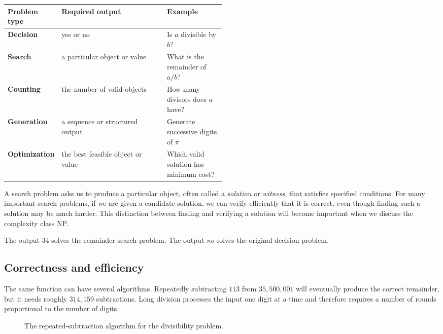 \documentclass[11pt]{article}
\begin{document}
\begin{center}
\begin{tabularx}{0.92\linewidth}{>{\bfseries}p{0.23\linewidth}X p{0.27\linewidth}}
\toprule
Problem type & Required output & Example \\
\midrule
Decision & yes or no & Is $a$ divisible by $b$? \\
Search & a particular object or value & What is the remainder of $a/b$? \\
Counting & the number of valid objects & How many divisors does $a$ have? \\
Generation & a sequence or structured output & Generate successive digits of $\pi$ \\
Optimization & the best feasible object or value & Which valid solution has minimum cost? \\
\bottomrule
\end{tabularx}
\end{center}

A search problem asks us to produce a particular object, often called a
\emph{solution} or \emph{witness}, that satisfies specified conditions. For many
important search problems, if we are given a candidate solution, we can verify
efficiently that it is correct, even though finding such a solution may be much
harder. This distinction between finding and verifying a solution will become
important when we discuss the complexity class NP.

The output $34$ solves the remainder-search problem. The output \emph{no} solves
the original decision problem.

\subsection{Correctness and efficiency}

The same function can have several algorithms. Repeatedly subtracting $113$ from $35{,}500{,}001$ will eventually produce the correct remainder, but it needs roughly $314{,}159$ subtractions. Long division processes the input one digit at a time and therefore requires a number of rounds proportional to the number of digits.

\begin{figure}[htbp]
  \centering
  \caption{The repeated-subtraction algorithm for the divisibility problem.}
  \label{fig:repeated-subtraction-division}
\end{figure}
\end{document}
